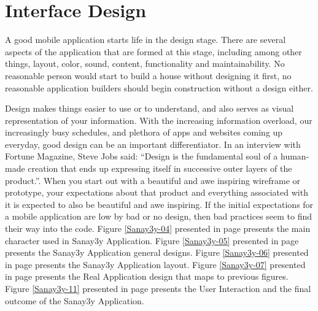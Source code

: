 \documentclass[12pt,a4paper,final,twoside,onecolumn,titlepage]{book}
\begin{document}
\section{Interface Design}
A good mobile application starts life in the design stage. There are several aspects of the application that are formed at this stage, including among other things, layout, color, sound, content, functionality and maintainability. No reasonable person would start to build a house without designing it first, no reasonable application builders should begin construction without a design either.

Design makes things easier to use or to understand, and also serves as visual representation of your information. With the increasing information overload, our increasingly busy schedules, and plethora of apps and websites coming up everyday, good design can be an important differentiator. In an interview with Fortune Magazine, Steve Jobs said: “Design is the fundamental soul of a human-made creation that ends up expressing itself in successive outer layers of the product.”. When you start out with a beautiful and awe inspiring wireframe or prototype, your expectations about that product and everything associated with it is expected to also be beautiful and awe inspiring. If the initial expectations for a mobile application are low by bad or no design, then bad practices seem to find their way into the code. Figure \ref{Sanay3y-04} presented in page \pageref{Sanay3y-04} presents the main character used in Sanay3y Application. Figure \ref{Sanay3y-05} presented in page \pageref{Sanay3y-05} presents the Sanay3y Application general designs. Figure \ref{Sanay3y-06} presented in page \pageref{Sanay3y-06} presents the Sanay3y Application layout. Figure \ref{Sanay3y-07} presented in page \pageref{Sanay3y-07} presents the Real Application design that maps to previous figures. Figure \ref{Sanay3y-11} presented in page \pageref{Sanay3y-11} presents the User Interaction and the final outcome of the Sanay3y Application.
\end{document}
